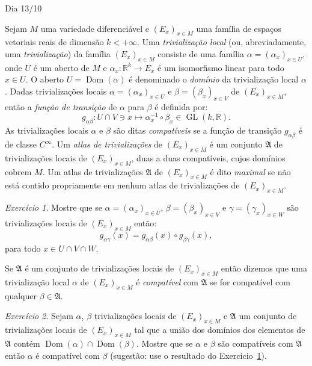 \documentclass[oneside,11pt]{amsart}
\newcommand{\R}{\mathds R}
\DeclareMathOperator{\Dom}{Dom}
\DeclareMathOperator{\GL}{GL}
\theoremstyle{remark}\newtheorem{exercise}{Exercício}[section]
\theoremstyle{plain}\newtheorem{teo}{Teorema}[section]
\theoremstyle{plain}\newtheorem{lem}[teo]{Lema}
\theoremstyle{plain}\newtheorem{prop}[teo]{Proposição}
\theoremstyle{definition}\newtheorem{defin}[teo]{Definição}
\theoremstyle{remark}\newtheorem{rem}[teo]{Observação}
\theoremstyle{definition}\newtheorem{example}[teo]{Exemplo}
\numberwithin{equation}{section}
\begin{document}
\begin{section}{Dia 13/10}

Sejam $M$ uma variedade diferenciável e $(E_x)_{x\in M}$ uma família de espaços vetoriais reais de dimensão $k<+\infty$. Uma {\em trivialização local\/}
(ou, abreviadamente, uma {\em trivialização}) da família $(E_x)_{x\in M}$ consiste de uma família $\alpha=(\alpha_x)_{x\in U}$, onde $U$ é um aberto de $M$ e
$\alpha_x:\R^k\to E_x$ é um isomorfismo linear
para todo $x\in U$. O aberto $U=\Dom(\alpha)$ é denominado o {\em domínio\/} da trivialização local $\alpha$. Dadas trivializações locais $\alpha=(\alpha_x)_{x\in U}$ e
$\beta=(\beta_x)_{x\in V}$ de $(E_x)_{x\in M}$, então a {\em função de transição\/}
de $\alpha$ para $\beta$ é definida por:
\[g_{\alpha\beta}:U\cap V\ni x\longmapsto\alpha_x^{-1}\circ\beta_x\in\GL(k,\R).\]
As trivializações locais $\alpha$ e $\beta$ são ditas {\em compatíveis\/} se a função de transição $g_{\alpha\beta}$ é de classe $C^\infty$.
Um {\em atlas de trivializações\/} de $(E_x)_{x\in M}$ é um conjunto $\mathfrak A$ de trivializações locais de $(E_x)_{x\in M}$, duas a duas
compatíveis, cujos domínios cobrem $M$. Um atlas de trivializações $\mathfrak A$ de $(E_x)_{x\in M}$ é dito {\em maximal\/} se não está contido propriamente em nenhum
atlas de trivializações de $(E_x)_{x\in M}$.

\begin{exercise}\label{exe:alphabetagamma}
Mostre que se $\alpha=(\alpha_x)_{x\in U}$, $\beta=(\beta_x)_{x\in V}$ e $\gamma=(\gamma_x)_{x\in W}$ são trivializações locais de $(E_x)_{x\in M}$ então:
\[g_{\alpha\gamma}(x)=g_{\alpha\beta}(x)\circ g_{\beta\gamma}(x),\]
para todo $x\in U\cap V\cap W$.
\end{exercise}

Se $\mathfrak A$ é um conjunto de trivializações locais de $(E_x)_{x\in M}$ então dizemos que uma trivialização local $\alpha$ de $(E_x)_{x\in M}$ é
{\em compatível\/} com $\mathfrak A$ se for compatível com qualquer $\beta\in\mathfrak A$.
\begin{exercise}\label{exe:alphabetafrakA}
Sejam $\alpha$, $\beta$ trivializações locais de $(E_x)_{x\in M}$ e $\mathfrak A$ um conjunto de trivializações locais de $(E_x)_{x\in M}$ tal que a união
dos domínios dos elementos de $\mathfrak A$ contém $\Dom(\alpha)\cap\Dom(\beta)$. Mostre que se $\alpha$ e $\beta$ são compatíveis com $\mathfrak A$ então
$\alpha$ é compatível com $\beta$ (sugestão: use o resultado do Exercício~\ref{exe:alphabetagamma}).
\end{exercise}


\end{section}
\end{document}
